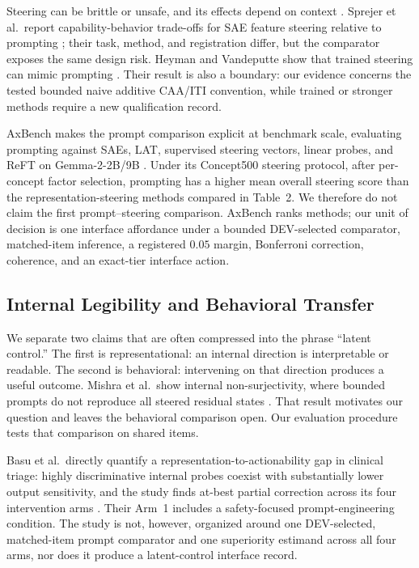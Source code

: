\documentclass[sigconf]{acmart}
\begin{document}
Steering can be brittle or unsafe, and its effects depend on context \cite{fan2026asteer,korznikov2025rogue}. Sprejer et al.\ report capability-behavior trade-offs for SAE feature steering relative to prompting \cite{sprejer2026mindgap}; their task, method, and registration differ, but the comparator exposes the same design risk. Heyman and Vandeputte show that trained steering can mimic prompting \cite{heyman2026steer}. Their result is also a boundary: our evidence concerns the tested bounded naive additive CAA/ITI convention, while trained or stronger methods require a new qualification record.

AxBench makes the prompt comparison explicit at benchmark scale, evaluating prompting against SAEs, LAT, supervised steering vectors, linear probes, and ReFT on Gemma-2-2B/9B \cite{wu2025axbench}. Under its Concept500 steering protocol, after per-concept factor selection, prompting has a higher mean overall steering score than the representation-steering methods compared in Table~2. We therefore do not claim the first prompt--steering comparison. AxBench ranks methods; our unit of decision is one interface affordance under a bounded DEV-selected comparator, matched-item inference, a registered \(0.05\) margin, Bonferroni correction, coherence, and an exact-tier interface action.

\subsection{Internal Legibility and Behavioral Transfer}

We separate two claims that are often compressed into the phrase ``latent control.'' The first is representational: an internal direction is interpretable or readable. The second is behavioral: intervening on that direction produces a useful outcome. Mishra et al.\ show internal non-surjectivity, where bounded prompts do not reproduce all steered residual states \cite{mishra2026nonsurj}. That result motivates our question and leaves the behavioral comparison open. Our evaluation procedure tests that comparison on shared items.

Basu et al.\ directly quantify a representation-to-actionability gap in clinical triage: highly discriminative internal probes coexist with substantially lower output sensitivity, and the study finds at-best partial correction across its four intervention arms \cite{basu2026actionability}. Their Arm~1 includes a safety-focused prompt-engineering condition. The study is not, however, organized around one DEV-selected, matched-item prompt comparator and one superiority estimand across all four arms, nor does it produce a latent-control interface record.
\end{document}
